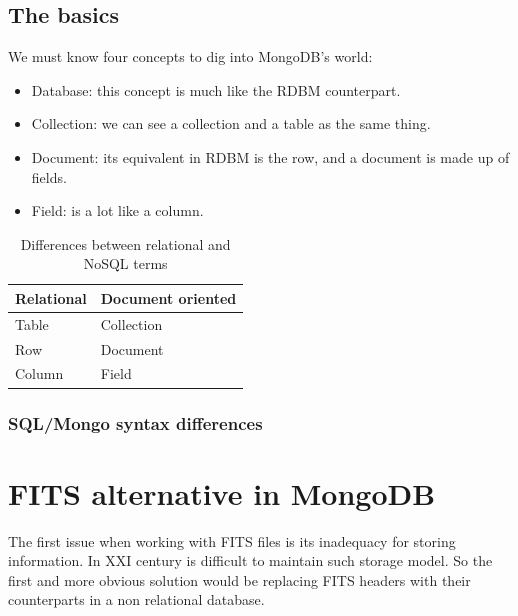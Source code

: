 \subsection{The basics}

We must know four concepts to dig into MongoDB's world:

\begin{itemize}
\item Database: this concept is much like the RDBM counterpart.
\item Collection: we can see a collection and a table as the same thing.
\item Document: its equivalent in RDBM is the row, and a document is made up of fields.
\item Field: is a lot like a column.
\end{itemize}


\begin{table}
\begin{center}
\begin{tabular}{|l|l|}
\hline
\textbf{Relational} & \textbf{Document oriented} \\ 
\hline
Table & Collection\\
\hline
Row & Document\\
\hline
Column & Field \\
\hline
\end{tabular}
\end{center}
\caption{Differences between relational and NoSQL terms}
\end{table}





\subsubsection{SQL/Mongo syntax differences}





\section{FITS alternative in MongoDB}

The first issue when working with FITS files is its inadequacy for storing information. In XXI century is difficult to maintain such storage model. So the first and more obvious solution would be replacing FITS headers with their counterparts in a non relational database. \newline

